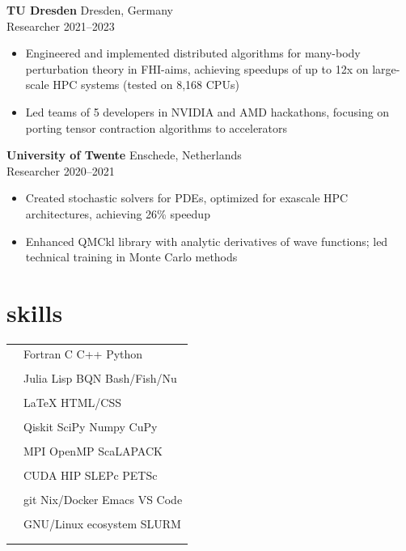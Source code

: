 \documentclass[12pt]{article}
\newcommand{\entry}[4]{{{\textbf{#1}}} \hfill #3 \\ #2 \hfill #4}
\newcommand{\tableentry}[3]{\textsc{#1} & #2\expandafter\ifstrequal\expandafter{#3}{}{\\}{\\[6pt]}}
\begin{document}
\begin{paracol}{2}
    \entry{TU Dresden}{Researcher}{Dresden, Germany}{2021--2023}
    \begin{itemize}[noitemsep,leftmargin=3.5mm,rightmargin=0mm,topsep=6pt]
      \raggedright
    \item Engineered and implemented distributed algorithms for many-body perturbation theory in FHI-aims, achieving speedups of up to 12x on large-scale HPC systems (tested on 8,168 CPUs)
    \item Led teams of 5 developers in NVIDIA and AMD hackathons, focusing on porting tensor contraction algorithms to accelerators
    \end{itemize}

    \entry{University of Twente}{Researcher}{Enschede, Netherlands}{2020--2021}
    \begin{itemize}[noitemsep,leftmargin=3.5mm,rightmargin=0mm,topsep=6pt]
      \raggedright
    \item Created stochastic solvers for PDEs, optimized for exascale HPC architectures, achieving 26\% speedup
    \item Enhanced QMCkl library with analytic derivatives of wave functions; led technical training in Monte Carlo methods
    \end{itemize}


    \switchcolumn{}

    \section{skills}
    \begin{supertabular}{rl}
      \tableentry{\footnotesize\faCode}{Fortran \textperiodcentered{} C
        \textperiodcentered{} C++ \textperiodcentered{} Python}{}
      \tableentry{}{Julia \textperiodcentered{} Lisp \textperiodcentered{} BQN \textperiodcentered{} Bash/Fish/Nu}{}
      \tableentry{}{LaTeX \textperiodcentered{} HTML/CSS}{}
      \tableentry{\footnotesize\faCogs}{Qiskit \textperiodcentered{} SciPy \textperiodcentered{} Numpy \textperiodcentered{} CuPy}{}
      \tableentry{}{MPI \textperiodcentered{} OpenMP \textperiodcentered{} ScaLAPACK}{}
      \tableentry{}{CUDA \textperiodcentered{} HIP \textperiodcentered{} SLEPc \textperiodcentered{} PETSc}{}
      \tableentry{\footnotesize\faLaptop}{git \textperiodcentered{} Nix/Docker \textperiodcentered{}  Emacs \textperiodcentered{} VS Code}{}
      \tableentry{}{GNU/Linux ecosystem \textperiodcentered{} SLURM}{}


\end{supertabular}
\end{paracol}
\end{document}
